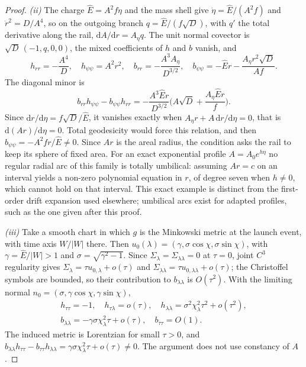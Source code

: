 \documentclass[12pt]{iopart}
\theoremstyle{plain}
\theoremstyle{definition}
\theoremstyle{remark}
\newcommand{\Ehat}{\hat E}
\newcommand{\dd}{\mathrm{d}}
\begin{document}
\begin{proof}
\emph{(ii)} The charge $\Ehat=A^2f\dot\eta$ and the mass shell give
$\dot\eta=\Ehat/(A^2f)$ and $\dot r^2=D/A^4$, so on the outgoing branch
$q=\Ehat/(f\sqrt D)$, with $q'$ the total derivative along the rail,
$\dd A/\dd r=A_\eta q$. The unit normal covector is $\sqrt D\,(-1,q,0,0)$, the mixed
coefficients of $h$ and $b$ vanish, and
\begin{equation}
    h_{rr}=-\frac{A^4}{D},\quad h_{\psi\psi}=A^2r^2,\quad
    b_{rr}=-\frac{A^3A_\eta}{D^{3/2}},\quad
    b_{\psi\psi}=-\Ehat r-\frac{A_\eta r^2\sqrt D}{Af} .
\end{equation}
The diagonal minor is
\begin{equation}
    b_{rr}h_{\psi\psi}-b_{\psi\psi}h_{rr}
    =-\frac{A^3\Ehat r}{D^{3/2}}\Big(A\sqrt D+\frac{A_\eta\Ehat r}{f}\Big).
\end{equation}
Since $\dd r/\dd\eta=f\sqrt D/\Ehat$, it vanishes exactly when
$A_\eta r+A\,\dd r/\dd\eta=0$, that is $\dd(Ar)/\dd\eta=0$. Total geodesicity would
force this relation, and then $b_{\psi\psi}=-A^2fr/\Ehat\neq0$. Since $Ar$ is the
areal radius, the condition asks the rail to keep its sphere of fixed area. For an
exact exponential profile $A=A_0e^{h\eta}$ no regular radial arc of this family is
totally umbilical: assuming $Ar=c$ on an interval yields a non-zero polynomial
equation in $r$, of degree seven when $h\neq0$, which cannot hold on that interval.
This exact example is distinct from the first-order drift expansion used elsewhere;
umbilical arcs exist for adapted profiles, such as the one given after this proof.

\emph{(iii)} Take a smooth chart in which $g$ is the Minkowski metric at the launch event,
with time axis $W/|W|$ there. Then $u_0(\lambda)=(\gamma,\sigma\cos\chi,\sigma\sin\chi)$,
with $\gamma=\Ehat/|W|>1$ and $\sigma=\sqrt{\gamma^2-1}$. Since
$\Sigma_\lambda=\Sigma_{\lambda\lambda}=0$ at $\tau=0$, joint $C^3$ regularity gives
$\Sigma_\lambda=\tau u_{0,\lambda}+o(\tau)$ and
$\Sigma_{\lambda\lambda}=\tau u_{0,\lambda\lambda}+o(\tau)$; the Christoffel symbols are
bounded, so their contribution to $b_{\lambda\lambda}$ is $O(\tau^2)$. With the limiting
normal $n_0=(\sigma,\gamma\cos\chi,\gamma\sin\chi)$,
\begin{equation}
    \begin{array}{l}
    h_{\tau\tau}=-1,\quad h_{\tau\lambda}=o(\tau),\quad
    h_{\lambda\lambda}=\sigma^2\chi_\lambda^2\tau^2+o(\tau^2),\\[2pt]
    b_{\lambda\lambda}=-\gamma\sigma\chi_\lambda^2\tau+o(\tau),\quad
    b_{\tau\tau}=O(1).
    \end{array}
\end{equation}
The induced metric is Lorentzian for small $\tau>0$, and
$b_{\lambda\lambda}h_{\tau\tau}-b_{\tau\tau}h_{\lambda\lambda}
=\gamma\sigma\chi_\lambda^2\tau+o(\tau)\neq0$. The argument does not use constancy of $A$.
\end{proof}
\end{document}
